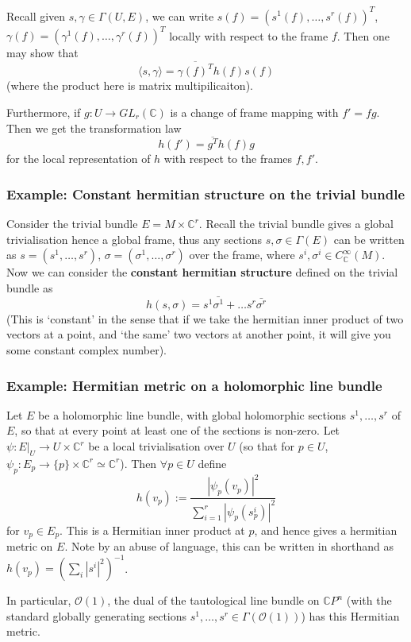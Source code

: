 \documentclass[a4paper]{article}
\theoremstyle{definition} \newtheorem*{definition}{Definition}
\theoremstyle{definition} \newtheorem*{definitions}{Definitions}
\theoremstyle{plain} \newtheorem{theorem}{Theorem}[section]
\theoremstyle{plain} \newtheorem{proposition}[theorem]{Proposition}
\theoremstyle{plain} \newtheorem{corollary}[theorem]{Corollary}
\theoremstyle{plain} \newtheorem{lemma}[theorem]{Lemma}
\theoremstyle{plain} \newtheorem{example}[theorem]{Example}
\newcommand{\defn}[1]{\textbf{#1}}
\newcommand{\complexnos}{\mathbb{C}}
\newcommand{\smooth}{C^\infty}
\begin{document}
Recall given $s, \gamma\in \Gamma(U, E)$, we can write $s(f)=(s^1(f), \ldots, s^r(f))^T$, $\gamma(f)=(\gamma^1(f), \ldots, \gamma^r(f))^T$ locally with respect to the frame $f$. Then one may show that 
$$\langle s, \gamma \rangle = \overline{\gamma(f)^T}h(f)s(f)$$
(where the product here is matrix multipilicaiton).

Furthermore, if $g:U\to GL_r(\complexnos)$ is a change of frame mapping with $f'=fg$. Then we get the transformation law
$$h(f')=\overline{g^T}h(f)g$$
for the local representation of $h$ with respect to the frames $f, f'$.

\subsubsection{Example: Constant hermitian structure on the trivial bundle}
Consider the trivial bundle $E=M\times \complexnos^r$. Recall the trivial bundle gives a global trivialisation hence a global frame, thus any sections $s, \sigma \in \Gamma(E)$ can be written as  $s=(s^1, \ldots, s^r)$, $\sigma=(\sigma^1, \ldots, \sigma^r)$ over the frame, where $s^i, \sigma^i \in \smooth_\complexnos (M)$. Now we can consider the \defn{constant hermitian structure} defined on the trivial bundle as
$$h(s, \sigma)=s^1\bar{\sigma^1} + \ldots s^r\bar{\sigma^r}$$
(This is `constant' in the sense that if we take the hermitian inner product of two vectors at a point, and `the same' two vectors at another point, it will give you some constant complex number). 

\subsubsection{Example: Hermitian metric on a holomorphic line bundle}
Let $E$ be a holomorphic line bundle, with global holomorphic sections $s^1, \ldots, s^r$ of $E$, so that at every point at least one of the sections is non-zero. Let $\psi:E|_U\to U\times \complexnos^r$ be a local trivialisation over $U$ (so that for $p\in U$, $\psi_p:E_p\to \{p\}\times \complexnos^r \simeq \complexnos^r$). Then $\forall p\in U$ define
$$h(v_p):=\frac{|\psi_p(v_p)|^2}{\sum_{i=1}^r |\psi_p (s^i_p)|^2}$$
for $v_p\in E_p$. This is a Hermitian inner product at $p$, and hence gives a hermitian metric on $E$. Note by an abuse of language, this can be written in shorthand as $h(v_p)=(\sum_i |s^i|^2)^{-1}$.

In particular, $\mathcal{O}(1)$, the dual of the tautological line bundle on $\complexnos P^n$ (with the standard globally generating sections $s^1, \dots, s^r\in \Gamma(\mathcal{O}(1))$) has this Hermitian metric.
\end{document}
